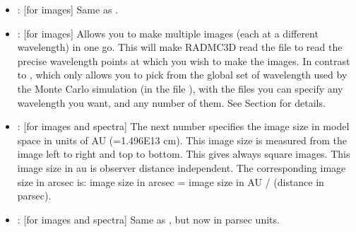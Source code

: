 \documentclass[letterpaper,10pt,english]{sphinxmanual}
\begin{document}
\begin{itemize}
\item {} 
: {[}for images{]} Same as .

\item {} 
: {[}for images{]} Allows you to make multiple images (each at a
different wavelength) in one go. This will make RADMC\sphinxhyphen{}3D read the file
 to read the precise wavelength points at which you wish
to make the images. In contrast to , which only allows you to
pick from the global set of wavelength used by the Monte Carlo simulation (in
the file ), with the
 files you can
specify any wavelength you want, and any number of them. See Section
{\hyperref[\detokenize{imagesspectra:sec-set-camera-frequencies}]{}} for details.

\item {} 
: {[}for images and spectra{]} The next number
specifies the image size in model space in units of AU (=1.496E13
cm). This image size is measured from the image left to
right and top to bottom. This gives always square images. This image
size in au is observer distance independent. The corresponding image
size in arcsec is: image size in arcsec = image size in AU /
(distance in parsec).

\item {} 
: {[}for images and spectra{]} Same as , but
now in parsec units.


\end{itemize}
\end{document}
